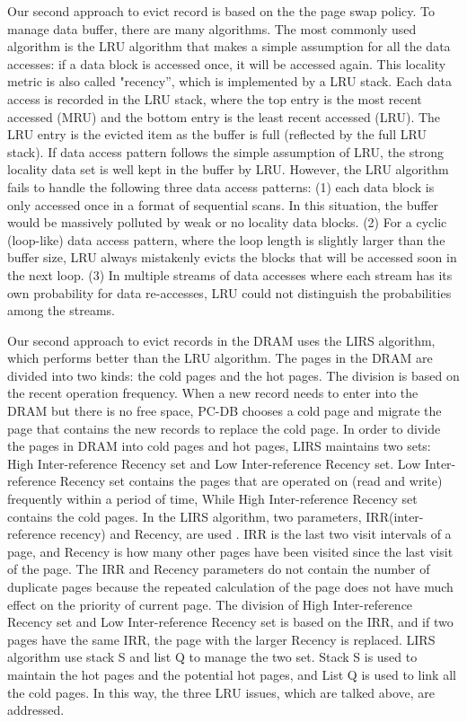 Our second approach to evict record is based on the the page swap policy. To manage data buffer, there are many algorithms. The most commonly used algorithm is the LRU algorithm that makes a simple assumption for all the data accesses: if a data block is accessed once, it will be accessed again. This locality metric is also called "recency'', which is implemented by a LRU stack. Each data access is recorded in the LRU stack, where the top entry is the most recent accessed (MRU) and the bottom entry is the least recent accessed (LRU). The LRU entry is the evicted item as the buffer is full (reflected by the full LRU stack). If data access pattern follows the simple assumption of LRU, the strong locality data set is well kept in the buffer by LRU. However, the LRU algorithm fails to handle the following three data access patterns: (1) each data block is only accessed once in a format of sequential scans. In this situation, the buffer would be massively polluted by weak or no locality data blocks. (2) For a cyclic (loop-like) data access pattern, where the loop length is slightly larger than the buffer size, LRU always mistakenly evicts the blocks that will be accessed soon in the next loop. (3) In multiple streams of data accesses where each stream has its own probability for data re-accesses, LRU could not distinguish the probabilities among the streams. 

Our second approach to evict records in the DRAM uses the LIRS algorithm, which performs better than the LRU algorithm. The pages in the DRAM are divided into two kinds: the cold pages and the hot pages. The division is based on the recent operation frequency. When a new record needs to enter into the DRAM but there is no free space, PC-DB chooses a cold page and migrate the page that contains the new records to replace the cold page. In order to divide the pages in DRAM into cold pages and hot pages, LIRS maintains two sets: High Inter-reference Recency set and Low Inter-reference Recency set. Low Inter-reference Recency set contains the pages that are operated on (read and write) frequently within a period of time, While High Inter-reference Recency set contains the cold pages. In the LIRS algorithm, two parameters, IRR(inter-reference recency) and Recency, are used . IRR is the last two visit intervals of a page, and Recency is how many other pages have been visited since the last visit of the page. The IRR and Recency parameters do not contain the number of duplicate pages because the repeated calculation of the page does not have much effect on the priority of current page. The division of High Inter-reference Recency set and Low Inter-reference Recency set is based on the IRR, and if two pages have the same IRR, the page with the larger Recency is replaced. LIRS algorithm use stack S and list Q to manage the two set. Stack S is used to maintain the hot pages and the potential hot pages, and List Q is used to link all the cold pages. In this way, the three LRU issues, which are talked above, are addressed. 
